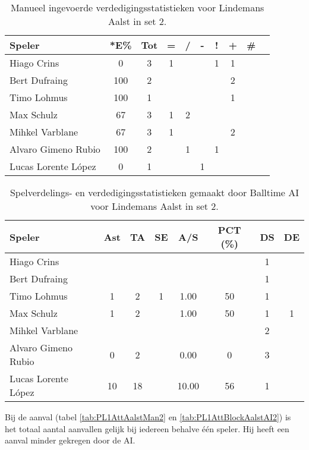 \begin{table}[ht!]
  \centering
  \scriptsize
    \begin{tabular}{|l|c|c|c|c|c|c|c|c|c|}
      \hline
      \textbf{Speler} & *E\% & Tot & = & / & - & ! & + & \# \\ \hline
      Hiago Crins & 0 & 3 & 1 &  &  & 1 & 1 &  \\ 
      Bert Dufraing & 100 & 2 &  &  &  &  & 2 &  \\
      Timo Lohmus & 100 & 1 &  &  &  &  & 1 &  \\
      Max Schulz & 67 & 3 & 1 & 2 &  &  &  &  \\
      Mihkel Varblane & 67 & 3 & 1 &  &  &  & 2 &  \\
      Alvaro Gimeno Rubio & 100 & 2 &  & 1 &  & 1 &  &  \\
      Lucas Lorente López & 0 & 1 &  &  & 1 &  &  &  \\ \hline
  \end{tabular}
  \caption[Manueel ingevoerde verdedigingsstatistieken voor Lindemans Aalst in set 2]{\label{tab:PL1DigAalstMan2}Manueel ingevoerde verdedigingsstatistieken voor Lindemans Aalst in set 2.}
\end{table}

\begin{table}[ht!]
  \centering
  \scriptsize
  \begin{tabular}{|l|c|c|c|c|c|c|c|} \hline
    \textbf{Speler} & Ast & TA & SE & A/S & PCT (\%) & DS & DE \\ \hline
    Hiago Crins &  &  &  &  &  & 1 &  \\
    Bert Dufraing &  &  &  &  &  & 1 &  \\ 
    Timo Lohmus & 1 & 2 & 1 & 1.00 & 50 & 1 &  \\
    Max Schulz & 1 & 2 &  & 1.00 & 50 & 1 & 1 \\
    Mihkel Varblane &  &  &  &  &  & 2 &  \\
    Alvaro Gimeno Rubio & 0 & 2 &  & 0.00 & 0 & 3 &  \\
    Lucas Lorente López & 10 & 18 &  & 10.00 & 56 & 1 &  \\ \hline
  \end{tabular}
  \caption[Spelverdelings- en verdedigingsstatistieken gemaakt door Balltime AI voor Lindemans Aalst in set 2]{\label{tab:PL1SetDigAalstAI2}Spelverdelings- en verdedigingsstatistieken gemaakt door Balltime AI voor Lindemans Aalst in set 2.}
\end{table}

Bij de aanval (tabel \ref{tab:PL1AttAalstMan2} en \ref{tab:PL1AttBlockAalstAI2}) is het totaal aantal aanvallen gelijk bij iedereen behalve één speler. Hij heeft een aanval minder gekregen door de AI. 


